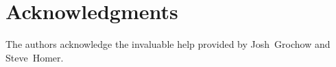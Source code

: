 \section{Acknowledgments}

The authors acknowledge the invaluable help provided by Josh~Grochow and Steve~Homer.

